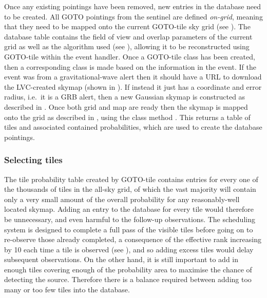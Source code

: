 \begin{colsection}
Once any existing pointings have been removed, new entries in the database need to be created. All GOTO pointings from the sentinel are defined \textit{on-grid}, meaning that they need to be mapped onto the current GOTO-tile sky grid (see ). The database  table contains the field of view and overlap parameters of the current grid as well as the algorithm used (see ), allowing it to be reconstructed using GOTO-tile within the event handler. Once a GOTO-tile  class has been created, then a corresponding  class is made based on the information in the event. If the event was from a gravitational-wave alert then it should have a URL to download the LVC-created skymap (shown in ). If instead it just has a coordinate and error radius, i.e.\ it is a GRB alert, then a new Gaussian skymap is constructed as described in . Once both grid and map are ready then the skymap is mapped onto the grid as described in , using the class method . This returns a table of tiles and associated contained probabilities, which are used to create the database pointings. %

\subsubsection{Selecting tiles}

The tile probability table created by GOTO-tile contains entries for every one of the thousands of tiles in the all-sky grid, of which the vast majority will contain only a very small amount of the overall probability for any reasonably-well located skymap. Adding an entry to the database for every tile would therefore be unnecessary, and even harmful to the follow-up observations. The scheduling system is designed to complete a full pass of the visible tiles before going on to re-observe those already completed, a consequence of the effective rank increasing by 10 each time a tile is observed (see ), and so adding excess tiles would delay subsequent observations. On the other hand, it is still important to add in enough tiles covering enough of the probability area to maximise the chance of detecting the source. Therefore there is a balance required between adding too many or too few tiles into the database.


\end{colsection}
